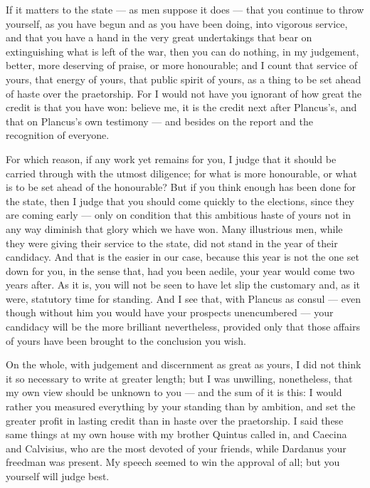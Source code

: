 

 If it matters to the state --- as men suppose it does --- that you continue to throw yourself, as you have begun and as you have been doing, into vigorous service, and that you have a hand in the very great undertakings that bear on extinguishing what is left of the war, then you can do nothing, in my judgement, better, more deserving of praise, or more honourable; and I count that service of yours, that energy of yours, that public spirit of yours, as a thing to be set ahead of haste over the praetorship. For I would not have you ignorant of how great the credit is that you have won: believe me, it is the credit next after Plancus's, and that on Plancus's own testimony --- and besides on the report and the recognition of everyone.

 For which reason, if any work yet remains for you, I judge that it should be carried through with the utmost diligence; for what is more honourable, or what is to be set ahead of the honourable? But if you think enough has been done for the state, then I judge that you should come quickly to the elections, since they are coming early --- only on condition that this ambitious haste of yours not in any way diminish that glory which we have won. Many illustrious men, while they were giving their service to the state, did not stand in the year of their candidacy. And that is the easier in our case, because this year is not the one set down for you, in the sense that, had you been aedile, your year would come two years after. As it is, you will not be seen to have let slip the customary and, as it were, statutory time for standing. And I see that, with Plancus as consul --- even though without him you would have your prospects unencumbered --- your candidacy will be the more brilliant nevertheless, provided only that those affairs of yours have been brought to the conclusion you wish.

 On the whole, with judgement and discernment as great as yours, I did not think it so necessary to write at greater length; but I was unwilling, nonetheless, that my own view should be unknown to you --- and the sum of it is this: I would rather you measured everything by your standing than by ambition, and set the greater profit in lasting credit than in haste over the praetorship. I said these same things at my own house with my brother Quintus called in, and Caecina and Calvisius, who are the most devoted of your friends, while Dardanus your freedman was present. My speech seemed to win the approval of all; but you yourself will judge best.
